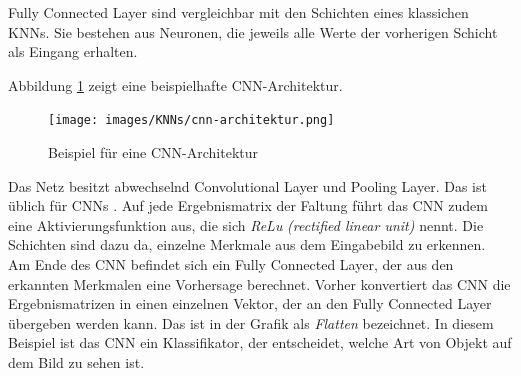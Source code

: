 Fully Connected Layer sind vergleichbar mit den Schichten eines klassichen \acp{KNN}. Sie bestehen aus Neuronen, die jeweils alle Werte der vorherigen Schicht als Eingang erhalten. \cite{DeepLearningBook}

Abbildung \ref{fig:cnn-architecture} zeigt eine beispielhafte \ac{CNN}-Architektur. 
\begin{figure}[h]
   \centering
   \texttt{[image: images/KNNs/cnn-architektur.png]}
   \caption{Beispiel für eine \ac{CNN}-Architektur \emph{\cite{cnn-architektur-img}}}
   \label{fig:cnn-architecture}
\end{figure}
Das Netz besitzt abwechselnd Convolutional Layer und Pooling Layer. Das ist üblich für \acp{CNN} \cite{DeepLearningBook}. Auf jede Ergebnismatrix der Faltung führt das \ac{CNN} zudem eine Aktivierungsfunktion aus, die sich \emph{ReLu} \emph{(rectified linear unit)} nennt. Die Schichten sind dazu da, einzelne Merkmale aus dem Eingabebild zu erkennen. Am Ende des \ac{CNN} befindet sich ein Fully Connected Layer, der aus den erkannten Merkmalen eine Vorhersage berechnet. Vorher konvertiert das \ac{CNN} die Ergebnismatrizen in einen einzelnen Vektor, der an den Fully Connected Layer übergeben werden kann. Das ist in der Grafik als \emph{Flatten} bezeichnet. In diesem Beispiel ist das \ac{CNN} ein Klassifikator, der entscheidet, welche Art von Objekt auf dem Bild zu sehen ist.